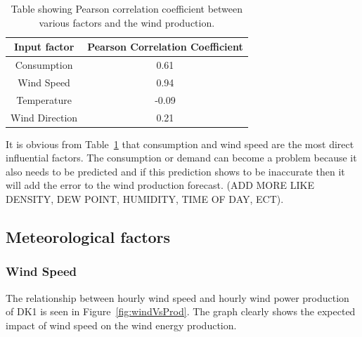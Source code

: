 \begin{table}[H]
\centering  %
\begin{tabular}{c c} %
Input factor & Pearson Correlation Coefficient \\ [0.5ex] %
\hline                  %
Consumption & 0.61 \\ %
Wind Speed & 0.94 \\
Temperature & -0.09 \\
Wind Direction & 0.21 \\ [1ex] %
\hline %
\end{tabular}
\caption{Table showing Pearson correlation coefficient between various factors and the wind production.} %
\label{table:pearsonCoeficientWindProduction} %
\end{table}

It is obvious from Table~\ref{table:pearsonCoeficientWindProduction} that consumption and wind speed are the most direct influential factors. The consumption or demand can become a problem because it also needs to be predicted and if this prediction shows to be inaccurate then it will add the error to the wind production forecast.  (ADD MORE LIKE DENSITY, DEW POINT, HUMIDITY, TIME OF DAY, ECT).

\subsection{Meteorological factors}

\subsubsection{Wind Speed}
The relationship between hourly wind speed and hourly wind power production of DK1 is seen in Figure~\ref{fig:windVsProd}. The graph clearly shows the expected impact of wind speed on the wind energy production.

